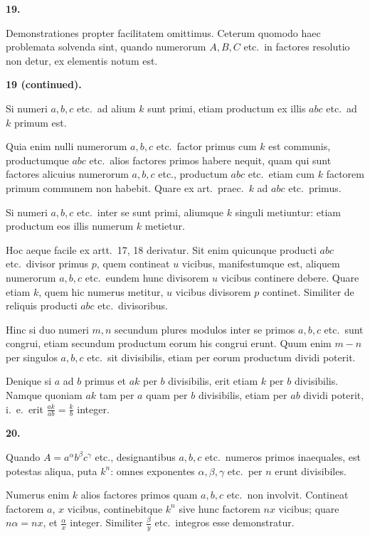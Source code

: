 \documentclass[12pt,a4paper]{article}
\theoremstyle{plain}
\theoremstyle{definition}
\theoremstyle{remark}
\begin{document}
\textbf{19.}

Demonstrationes propter facilitatem omittimus. Ceterum quomodo haec problemata solvenda sint, quando numerorum $A, B, C$ etc.\ in factores resolutio non detur, ex elementis notum est.

\textbf{19 \textnormal{(continued).}}

Si numeri $a, b, c$ etc.\ ad alium $k$ sunt primi, etiam productum ex illis $abc$ etc.\ ad $k$ primum est.

Quia enim nulli numerorum $a, b, c$ etc.\ factor primus cum $k$ est communis, productumque $abc$ etc.\ alios factores primos habere nequit, quam qui sunt factores alicuius numerorum $a, b, c$ etc., productum $abc$ etc.\ etiam cum $k$ factorem primum communem non habebit. Quare ex art.\ praec.\ $k$ ad $abc$ etc.\ primus.

Si numeri $a, b, c$ etc.\ inter se sunt primi, aliumque $k$ singuli metiuntur: etiam productum eos illis numerum $k$ metietur.

Hoc aeque facile ex artt.~17, 18 derivatur. Sit enim quicunque producti $abc$ etc.\ divisor primus $p$, quem contineat $u$ vicibus, manifestumque est, aliquem numerorum $a, b, c$ etc.\ eundem hunc divisorem $u$ vicibus continere debere. Quare etiam $k$, quem hic numerus metitur, $u$ vicibus divisorem $p$ continet. Similiter de reliquis producti $abc$ etc.\ divisoribus.

Hinc si duo numeri $m, n$ secundum plures modulos inter se primos $a, b, c$ etc.\ sunt congrui, etiam secundum productum eorum his congrui erunt. Quum enim $m - n$ per singulos $a, b, c$ etc.\ sit divisibilis, etiam per eorum productum dividi poterit.

Denique si $a$ ad $b$ primus et $ak$ per $b$ divisibilis, erit etiam $k$ per $b$ divisibilis. Namque quoniam $ak$ tam per $a$ quam per $b$ divisibilis, etiam per $ab$ dividi poterit, i.~e.\ erit $\frac{ak}{ab} = \frac{k}{b}$ integer.

\textbf{20.}

Quando $A = a^\alpha b^\beta c^\gamma$ etc., designantibus $a, b, c$ etc.\ numeros primos inaequales, est potestas aliqua, puta $k^n$: omnes exponentes $\alpha, \beta, \gamma$ etc.\ per $n$ erunt divisibiles.

Numerus enim $k$ alios factores primos quam $a, b, c$ etc.\ non involvit. Contineat factorem $a$, $x$ vicibus, continebitque $k^n$ sive hunc factorem $nx$ vicibus; quare $n\alpha = nx$, et $\frac{\alpha}{x}$ integer. Similiter $\frac{\beta}{y}$ etc.\ integros esse demonstratur.
\end{document}
